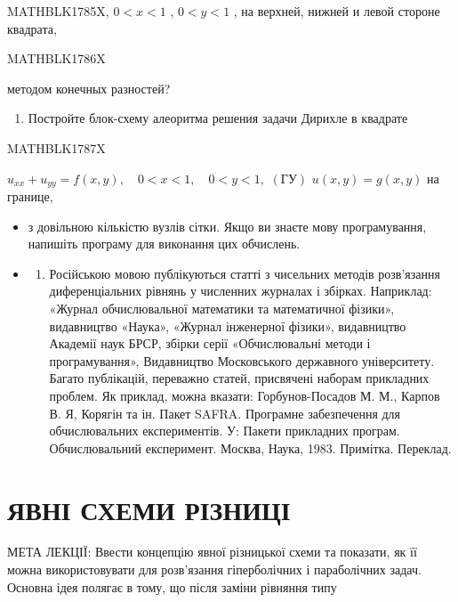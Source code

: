 \documentclass[
  ukrainian,
]{article}
\providecommand{\tightlist}{%
  \setlength{\itemsep}{0pt}\setlength{\parskip}{0pt}}
\begin{document}
MATHBLK1785X, \(0 < x < 1\) , \(0 < y < 1\) , на верхней, нижней и левой
стороне квадрата,

MATHBLK1786X

методом конечных разностей?

\begin{enumerate}
\def\labelenumi{\arabic{enumi}.}
\setcounter{enumi}{5}
\tightlist
\item
  Постройте блок-схему алеоритма решения задачи Дирихле в квадрате
\end{enumerate}

MATHBLK1787X

\(u_{xx} + u_{yy} = f(x, y), \quad 0 < x < 1, \quad 0 < y < 1,\)
\((\text{ГУ})\) \(u(x, y) = g(x, y)\) на границе,

\begin{itemize}
\tightlist
\item
  з довільною кількістю вузлів сітки. Якщо ви знаєте мову програмування,
  напишіть програму для виконання цих обчислень.
\item
  \begin{enumerate}
  \def\labelenumi{\arabic{enumi})}
  \tightlist
  \item
    Російською мовою публікуються статті з чисельних методів розв'язання
    диференціальних рівнянь у численних журналах і збірках. Наприклад:
    «Журнал обчислювальної математики та математичної фізики»,
    видавництво «Наука», «Журнал інженерної фізики», видавництво
    Академії наук БРСР, збірки серії «Обчислювальні методи і
    програмування», Видавництво Московського державного університету.
    Багато публікацій, переважно статей, присвячені наборам прикладних
    проблем. Як приклад, можна вказати: Горбунов-Посадов М. М., Карпов
    В. Я, Корягін та ін. Пакет SAFRA. Програмне забезпечення для
    обчислювальних експериментів. У: Пакети прикладних програм.
    Обчислювальний експеримент. Москва, Наука, 1983. Примітка. Переклад.
  \end{enumerate}
\end{itemize}

\section{ЯВНІ СХЕМИ
РІЗНИЦІ}\label{ux44fux432ux43dux456-ux441ux445ux435ux43cux438-ux440ux456ux437ux43dux438ux446ux456}

МЕТА ЛЕКЦІЇ: Ввести концепцію явної різницької схеми та показати, як її
можна використовувати для розв'язання гіперболічних і параболічних
задач. Основна ідея полягає в тому, що після заміни рівняння типу
\end{document}
